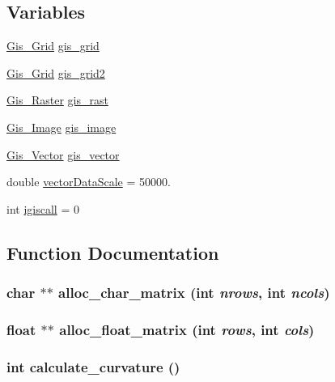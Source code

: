 \subsection*{Variables}
\begin{CompactItemize}
\item 
\hyperlink{structGis__Grid}{Gis\_\-Grid} \hyperlink{GisApi_8C_a0}{gis\_\-grid}
\item 
\hyperlink{structGis__Grid}{Gis\_\-Grid} \hyperlink{GisApi_8C_a1}{gis\_\-grid2}
\item 
\hyperlink{structGis__Raster}{Gis\_\-Raster} \hyperlink{GisApi_8C_a2}{gis\_\-rast}
\item 
\hyperlink{structGis__Image}{Gis\_\-Image} \hyperlink{GisApi_8C_a3}{gis\_\-image}
\item 
\hyperlink{structGis__Vector}{Gis\_\-Vector} \hyperlink{GisApi_8C_a4}{gis\_\-vector}
\item 
double \hyperlink{GisApi_8C_a5}{vector\-Data\-Scale} = 50000.
\item 
int \hyperlink{GisApi_8C_a6}{igiscall} = 0
\end{CompactItemize}


\subsection{Function Documentation}
\hypertarget{GisApi_8C_a12}{
\subsubsection[alloc\_\-char\_\-matrix]{\setlength{\rightskip}{0pt plus 5cm}char $\ast$$\ast$ alloc\_\-char\_\-matrix (int {\em nrows}, int {\em ncols})}}
\label{GisApi_8C_a12}


\hypertarget{GisApi_8C_a13}{
\subsubsection[alloc\_\-float\_\-matrix]{\setlength{\rightskip}{0pt plus 5cm}float $\ast$$\ast$ alloc\_\-float\_\-matrix (int {\em rows}, int {\em cols})}}
\label{GisApi_8C_a13}


\hypertarget{GisApi_8C_a22}{
\subsubsection[calculate\_\-curvature]{\setlength{\rightskip}{0pt plus 5cm}int calculate\_\-curvature ()}}
\label{GisApi_8C_a22}


